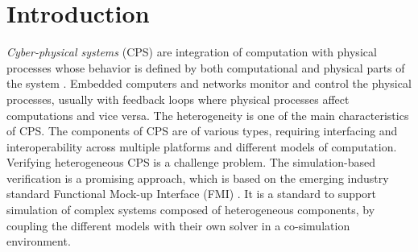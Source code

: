 \section{Introduction}

\textit{Cyber-physical systems} (CPS) are integration of computation with physical processes whose behavior is defined by both computational and physical parts of the system \cite{Zanero17}. Embedded computers and networks monitor and control the physical processes, usually with feedback loops where physical processes affect computations and vice versa. The heterogeneity is one of the main characteristics of CPS. The components of CPS are of various types, requiring interfacing and interoperability across multiple platforms and different models of computation. Verifying heterogeneous CPS is a challenge problem. The simulation-based verification is a promising approach, which is based on the emerging industry standard Functional Mock-up Interface (FMI) \cite{Blochwitz2011The}\cite{BromanBGLMTW13}. It is a standard to support simulation of complex systems composed of heterogeneous components, by coupling the different models with their own solver in a co-simulation environment.

